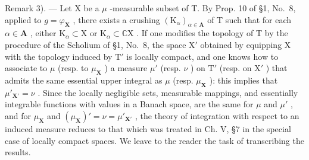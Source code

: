 Remark 3). --- Let X be a \(\mu\) -measurable subset of T. By Prop. 10 of §1, No.~8, applied to \(g = \varphi_{\mathbf{X}}\) , there exists a crushing \((\mathrm{K}_{\alpha})_{\alpha \in \mathbf{A}}\) of T such that for each \(\alpha \in \mathbf{A}\) , either \(\mathrm{K}_{\alpha} \subset \mathrm{X}\) or \(\mathrm{K}_{\alpha} \subset \mathbb{C}\mathrm{X}\) . If one modifies the topology of T by the procedure of the Scholium of §1, No.~8, the space \(\mathrm{X}'\) obtained by equipping X with the topology induced by \(\mathrm{T}'\) is locally compact, and one knows how to associate to \(\mu\) (resp. to \(\mu_{\mathbf{X}}\) ) a measure \(\mu'\) (resp. \(\nu\) ) on \(\mathrm{T}'\) (resp. on \(\mathrm{X}'\) ) that admits the same essential upper integral as \(\mu\) (resp. \(\mu_{\mathbf{X}}\) ): this implies that \(\mu'_{\mathbf{X}'} = \nu\) . Since the locally negligible sets, measurable mappings, and essentially integrable functions with values in a Banach space, are the same for \(\mu\) and \(\mu'\) , and for \(\mu_{\mathbf{X}}\) and \((\mu_{\mathbf{X}})' = \nu = \mu'_{\mathbf{X}'}\) , the theory of integration with respect to an induced measure reduces to that which was treated in Ch. V, §7 in the special case of locally compact spaces. We leave to the reader the task of transcribing the results.
\relax{}
